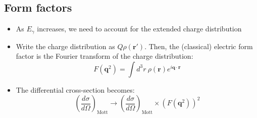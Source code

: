 \documentclass[11pt]{article}
\newcommand{\vr}{\mathbf{r}}
\newcommand{\vq}{\mathbf{q}}
\newcommand{\dd}[2]{\dfrac{d #1}{d #2}}
\begin{document}
\subsection{Form factors}
\begin{itemize}
  \item As $E_\gamma$ increases, we need to account for the extended charge distribution
  \item Write the charge distribution as $Q\rho(\vr')$. Then, the (classical) electric form factor is the Fourier transform of the charge distribution:
  \begin{equation}
    F(\vq^2) = \int d^3r~\rho(\vr) e^{i\vq\cdot\vr}
  \end{equation}
  \item The differential cross-section becomes:
  \begin{equation}
    \left(\dd\sigma\Omega\right)_\text{Mott} \rightarrow \left(\dd\sigma\Omega\right)_\text{Mott} \times \left(F(\vq^2)\right)^2
  \end{equation}
\end{itemize}
\end{document}
